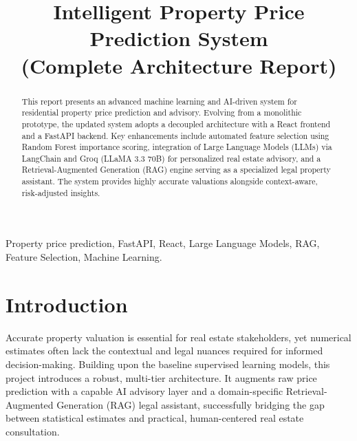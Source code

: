 \documentclass[conference]{IEEEtran}
\begin{document}
\title{Intelligent Property Price Prediction System\\(Complete Architecture Report)}

\author{
}

\maketitle

\begin{abstract}
This report presents an advanced machine learning and AI-driven system for residential property price prediction and advisory. Evolving from a monolithic prototype, the updated system adopts a decoupled architecture with a React frontend and a FastAPI backend. Key enhancements include automated feature selection using Random Forest importance scoring, integration of Large Language Models (LLMs) via LangChain and Groq (LLaMA 3.3 70B) for personalized real estate advisory, and a Retrieval-Augmented Generation (RAG) engine serving as a specialized legal property assistant. The system provides highly accurate valuations alongside context-aware, risk-adjusted insights.
\end{abstract}

\begin{IEEEkeywords}
Property price prediction, FastAPI, React, Large Language Models, RAG, Feature Selection, Machine Learning.
\end{IEEEkeywords}

\section{Introduction}
Accurate property valuation is essential for real estate stakeholders, yet numerical estimates often lack the contextual and legal nuances required for informed decision-making. Building upon the baseline supervised learning models, this project introduces a robust, multi-tier architecture. It augments raw price prediction with a capable AI advisory layer and a domain-specific Retrieval-Augmented Generation (RAG) legal assistant, successfully bridging the gap between statistical estimates and practical, human-centered real estate consultation.
\end{document}
